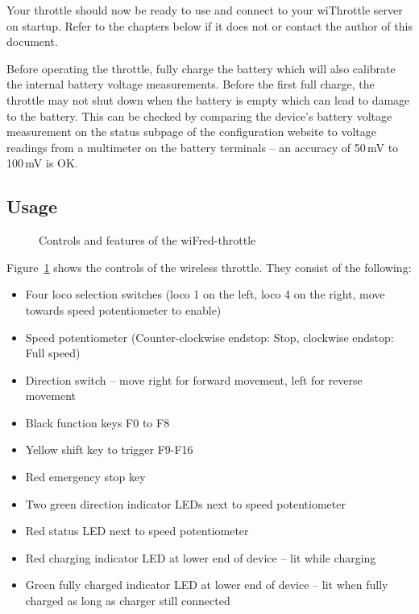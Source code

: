 \documentclass[11pt,a4paper]{scrartcl}
\begin{document}
Your throttle should now be ready to use and connect to your wiThrottle server on startup. Refer to the chapters below if it does not or contact the author of this document.

Before operating the throttle, fully charge the battery which will also calibrate the internal battery voltage measurements. Before the first full charge, the throttle may not shut down when the battery is empty which can lead to damage to the battery. This can be checked by comparing the device's battery voltage measurement on the status subpage of the configuration website to voltage readings from a multimeter on the battery terminals -- an accuracy of 50\,mV to 100\,mV is OK.

\subsection{Usage}

\begin{figure}[tbh]
  
  \centering

  \caption{Controls and features of the wiFred-throttle}
  \label{throttleControls}

\end{figure}

Figure~\ref{throttleControls} shows the controls of the wireless throttle. They consist of the following:

\begin{itemize}
\item Four loco selection switches (loco 1 on the left, loco 4 on the right, move towards speed potentiometer to enable)
\item Speed potentiometer (Counter-clockwise endstop: Stop, clockwise endstop: Full speed)
\item Direction switch -- move right for forward movement, left for reverse movement
\item Black function keys F0 to F8
\item Yellow shift key to trigger F9-F16
\item Red emergency stop key
\item Two green direction indicator LEDs next to speed potentiometer
\item Red status LED next to speed potentiometer
\item Red charging indicator LED at lower end of device -- lit while charging
\item Green fully charged indicator LED at lower end of device -- lit when fully charged as long as charger still connected
\end{itemize}
\end{document}
